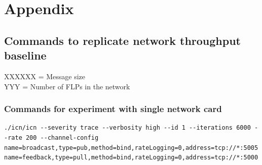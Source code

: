 \documentclass[]{article}
\begin{document}

\section{Appendix}

\subsection{Commands to replicate network throughput baseline}
\label{sec:appendix01}
XXXXXX = Message size \\
YYY = Number of FLPs in the network

\subsubsection{Commands for experiment with single network card}
\begin{lstlisting}
./icn/icn --severity trace --verbosity high --id 1 --iterations 6000 --rate 200 --channel-config name=broadcast,type=pub,method=bind,rateLogging=0,address=tcp://*:5005 name=feedback,type=pull,method=bind,rateLogging=0,address=tcp://*:5000
\end{lstlisting}
\end{document}
